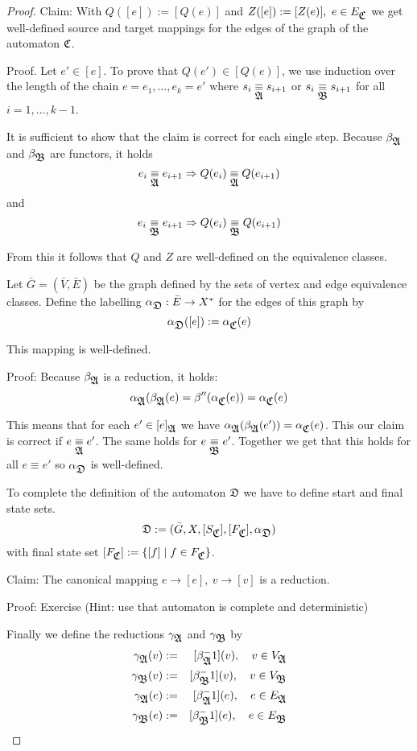 \begin{proof}
Claim: With $Q([e]) := [Q(e)]$ and $Z([e]) := [Z(e)],\ e \in E_{\mbox{$\mathfrak{C}$}}$ we get
well-defined source and target mappings for the edges of the graph of
the automaton $\mbox{$\mathfrak{C}$}$.

Proof. Let $e' \in [e]$. To prove that $Q(e') \in [Q(e)]$, we use induction over
the length of the chain $e = e_1, \ldots, e_k = e'$ where $s_i \underset{\mbox{$\mathfrak{A}$}}{\equiv}
s_{i+1}$ or $s_i \underset{\mbox{$\mathfrak{B}$}}{\equiv} s_{i+1}$ for all $i = 1,\ldots,k-1$. 

It is sufficient to show that the claim is correct for each single step. Because
$\beta_{\mbox{$\mathfrak{A}$}}$ and $\beta_{\mbox{$\mathfrak{B}$}}$ are functors, it holds
\[ e_i \underset{\mbox{$\mathfrak{A}$}}{\equiv} e_{i+1} \Rightarrow Q(e_i) \underset{\mbox{$\mathfrak{A}$}}{\equiv} Q(e_{i+1}) \]
and
\[ e_i \underset{\mbox{$\mathfrak{B}$}}{\equiv} e_{i+1} \Rightarrow Q(e_i) \underset{\mbox{$\mathfrak{B}$}}{\equiv} Q(e_{i+1}) \]

From this it follows that $Q$ and $Z$ are well-defined on the equivalence
classes.

Let $\bar{G} = (\bar{V}, \bar{E})$ be the graph defined by the sets of vertex
and edge equivalence classes. Define the labelling $\alpha_{\mbox{$\mathfrak{D}$}} : \bar{E}
\to X^*$ for the edges of this graph by
\[ \alpha_{\mbox{$\mathfrak{D}$}}([e]) := \alpha_{\mbox{$\mathfrak{C}$}}(e) \]

This mapping is well-defined. 

Proof: Because $\beta_{\mbox{$\mathfrak{A}$}}$ is a reduction, it holds:
\[ \alpha_{\mbox{$\mathfrak{A}$}}(\beta_{\mbox{$\mathfrak{A}$}}(e) = \beta''(\alpha_{\mbox{$\mathfrak{C}$}}(e)) =
\alpha_{\mbox{$\mathfrak{C}$}}(e) \]

This means that for each $e' \in [e]_{\mbox{$\mathfrak{A}$}}$ we have
$\alpha_{\mbox{$\mathfrak{A}$}}(\beta_{\mbox{$\mathfrak{A}$}}(e')) = \alpha_{\mbox{$\mathfrak{C}$}}(e)$. This our claim is
correct if $e \underset{\mbox{$\mathfrak{A}$}}{\equiv} e'$. The same holds for $e \underset{\mbox{$\mathfrak{B}$}}{\equiv} e'$. Together
we get that this holds for all $e \equiv e'$ so $\alpha_{\mbox{$\mathfrak{D}$}}$ is
well-defined.

To complete the definition of the automaton $\mbox{$\mathfrak{D}$}$ we have to define start and
final state sets.
\[ \mbox{$\mathfrak{D}$} := (\bar{G}, X, [S_{\mbox{$\mathfrak{C}$}}], [F_{\mbox{$\mathfrak{C}$}}], \alpha_{\mbox{$\mathfrak{D}$}}) \]
with final state set $[F_{\mbox{$\mathfrak{C}$}}] := \mbox{$\{[f] \mid f \in F_{\mbox{$\mathfrak{C}$}}\}$}$.

Claim: The canonical mapping $e \to [e],\ v \to [v]$ is a reduction.

Proof: Exercise (Hint: use that automaton is complete and deterministic)

Finally we define the reductions $\gamma_{\mbox{$\mathfrak{A}$}}$ and $\gamma_{\mbox{$\mathfrak{B}$}}$ by
\begin{eqnarray*}
\gamma_{\mbox{$\mathfrak{A}$}}(v) & := & [\beta_{\mbox{$\mathfrak{A}$}}^-1](v),\quad v \in V_{\mbox{$\mathfrak{A}$}} \\
\gamma_{\mbox{$\mathfrak{B}$}}(v) & := & [\beta_{\mbox{$\mathfrak{B}$}}^-1](v),\quad v \in V_{\mbox{$\mathfrak{B}$}} \\
\gamma_{\mbox{$\mathfrak{A}$}}(e) & := & [\beta_{\mbox{$\mathfrak{A}$}}^-1](e),\quad e \in E_{\mbox{$\mathfrak{A}$}} \\
\gamma_{\mbox{$\mathfrak{B}$}}(e) & := & [\beta_{\mbox{$\mathfrak{B}$}}^-1](e),\quad e \in E_{\mbox{$\mathfrak{B}$}} \\
\end{eqnarray*}
\end{proof}

